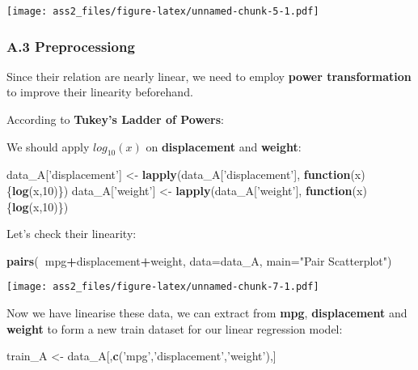 \documentclass[]{article}
\newenvironment{Shaded}{\begin{snugshade}}{\end{snugshade}}
\newcommand{\KeywordTok}[1]{\textcolor[rgb]{0.13,0.29,0.53}{\textbf{#1}}}
\newcommand{\DataTypeTok}[1]{\textcolor[rgb]{0.13,0.29,0.53}{#1}}
\newcommand{\DecValTok}[1]{\textcolor[rgb]{0.00,0.00,0.81}{#1}}
\newcommand{\StringTok}[1]{\textcolor[rgb]{0.31,0.60,0.02}{#1}}
\newcommand{\ControlFlowTok}[1]{\textcolor[rgb]{0.13,0.29,0.53}{\textbf{#1}}}
\newcommand{\OperatorTok}[1]{\textcolor[rgb]{0.81,0.36,0.00}{\textbf{#1}}}
\newcommand{\NormalTok}[1]{#1}
\begin{document}
\texttt{[image: ass2\_files/figure-latex/unnamed-chunk-5-1.pdf]}

\subsubsection{A.3 Preprocessiong}\label{a.3-preprocessiong}

Since their relation are nearly linear, we need to employ \textbf{power
transformation} to improve their linearity beforehand.

According to \textbf{Tukey's Ladder of Powers}:

We should apply \(log_{10}(x)\) on \textbf{displacement} and
\textbf{weight}:

\begin{Shaded}
\begin{Highlighting}[]
\NormalTok{data_A[}\StringTok{'displacement'}\NormalTok{] <-}\StringTok{ }\KeywordTok{lapply}\NormalTok{(data_A[}\StringTok{'displacement'}\NormalTok{], }\ControlFlowTok{function}\NormalTok{(x)\{}\KeywordTok{log}\NormalTok{(x,}\DecValTok{10}\NormalTok{)\})}
\NormalTok{data_A[}\StringTok{'weight'}\NormalTok{] <-}\StringTok{ }\KeywordTok{lapply}\NormalTok{(data_A[}\StringTok{'weight'}\NormalTok{], }\ControlFlowTok{function}\NormalTok{(x)\{}\KeywordTok{log}\NormalTok{(x,}\DecValTok{10}\NormalTok{)\})}
\end{Highlighting}
\end{Shaded}

Let's check their linearity:

\begin{Shaded}
\begin{Highlighting}[]
\KeywordTok{pairs}\NormalTok{(}\OperatorTok{~}\NormalTok{mpg}\OperatorTok{+}\NormalTok{displacement}\OperatorTok{+}\NormalTok{weight,}
      \DataTypeTok{data=}\NormalTok{data_A, }
   \DataTypeTok{main=}\StringTok{"Pair Scatterplot"}\NormalTok{)}
\end{Highlighting}
\end{Shaded}

\texttt{[image: ass2\_files/figure-latex/unnamed-chunk-7-1.pdf]}

Now we have linearise these data, we can extract from \textbf{mpg},
\textbf{displacement} and \textbf{weight} to form a new train dataset
for our linear regression model:

\begin{Shaded}
\begin{Highlighting}[]
\NormalTok{train_A <-}\StringTok{ }\NormalTok{data_A[,}\KeywordTok{c}\NormalTok{(}\StringTok{'mpg'}\NormalTok{,}\StringTok{'displacement'}\NormalTok{,}\StringTok{'weight'}\NormalTok{),]}
\end{Highlighting}
\end{Shaded}
\end{document}
